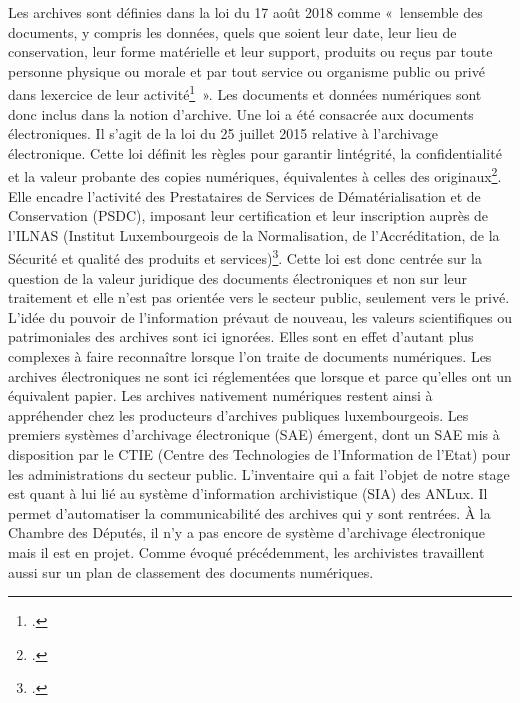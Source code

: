 Les archives sont définies dans la loi du 17 août 2018 comme
«~l\textquotesingle ensemble des documents, y compris les données, quels
que soient leur date, leur lieu de conservation, leur forme matérielle
et leur support, produits ou reçus par toute personne physique ou morale
et par tout service ou organisme public ou privé dans
l\textquotesingle exercice de leur activité\footcite{loi_2018}~». Les documents et données numériques sont donc inclus dans la notion d'archive.
Une loi a été consacrée aux documents électroniques. Il s'agit de la loi
du 25 juillet 2015 relative à l'archivage électronique. Cette loi définit les règles
pour garantir l\textquotesingle intégrité, la confidentialité et la
valeur probante des copies numériques, équivalentes à celles des
originaux\footcite{loi_2015}. Elle encadre l'activité des
Prestataires de Services de Dématérialisation et de Conservation (PSDC),
imposant leur certification et leur inscription auprès de l'ILNAS
(Institut Luxembourgeois de la Normalisation, de l'Accréditation, de la
Sécurité et qualité des produits et services)\footcite{loi_2015}. Cette loi est donc centrée sur la question de la valeur
juridique des documents électroniques et non sur leur traitement et elle n'est pas orientée vers le secteur public,
seulement vers le privé. L'idée
du pouvoir de l'information prévaut de nouveau, les valeurs scientifiques ou
patrimoniales des archives sont ici ignorées. Elles sont en effet
d'autant plus complexes à faire reconnaître lorsque l'on traite de
documents numériques. Les archives
électroniques ne sont ici réglementées que lorsque et parce qu'elles ont un
équivalent papier. Les archives nativement numériques restent ainsi à
appréhender chez les producteurs d'archives publiques luxembourgeois.
Les premiers systèmes d'archivage électronique (SAE) émergent, dont un
SAE mis à disposition par le CTIE (Centre des Technologies de l'Information de l'Etat) 
pour les administrations du secteur public. L'inventaire qui a fait l'objet
de notre stage est quant à lui lié au système d'information archivistique (SIA) des ANLux. Il permet d'automatiser la
communicabilité des archives qui y sont rentrées. À la Chambre des Députés, il n'y a
pas encore de système d'archivage électronique mais il est en projet. Comme
évoqué précédemment, les archivistes travaillent aussi sur un plan de
classement des documents numériques.

